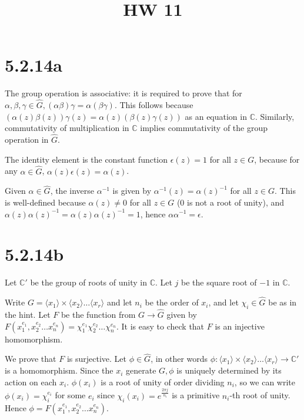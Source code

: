 \documentclass{article}
\title{HW 11}
\date{}
\def\C{\mathbb{C}}
\def\<{\langle}
\def\>{\rangle}
\def\inv{{-1}}
\begin{document}
\maketitle




\section*{5.2.14a}

The group operation is associative: it is required to prove that for $\alpha, \beta, \gamma \in \hat{G}, (\alpha\beta)\gamma = \alpha(\beta\gamma)$. This follows because $(\alpha(z)\beta(z))\gamma(z) = \alpha(z)(\beta(z)\gamma(z))$ as an equation in $\C$. Similarly, commutativity of multiplication in $\C$ implies commutativity of the group operation in $\hat{G}$.

The identity element is the constant function $\epsilon(z) = 1$ for all $z \in G$, because for any $\alpha \in \hat{G}$, $\alpha(z)\epsilon(z) = \alpha(z)$.

Given $\alpha \in \hat{G}$, the inverse $\alpha^\inv$ is given by $\alpha^\inv(z) = \alpha(z)^\inv$ for all $z \in G$. This is well-defined because $\alpha(z) \neq 0$ for all $z \in G$ (0 is not a root of unity), and $\alpha(z)\alpha(z)^\inv = \alpha(z) \alpha(z)^\inv = 1$, hence $\alpha \alpha^\inv = \epsilon$.

\section*{5.2.14b}

Let $\C'$ be the group of roots of unity in $\C$. Let $j$ be the square root of $-1$ in $\C$.

Write $G = \<x_1\> \times \<x_2\> \ldots \<x_r\>$ and let $n_i$ be the order of $x_i$, and let $\chi_i \in \hat{G}$ be as in the hint. Let $F$ be the function from $G \to \hat{G}$ given by $F(x_1^{e_1}, x_2^{e_2} \ldots x_n^{e_n}) = \chi_1^{e_1} \chi_2^{e_2} \ldots \chi_n^{e_n}$. It is easy to check that $F$ is an injective homomorphism.

We prove that $F$ is surjective. Let $\phi \in \hat{G}$, in other words $\phi : \<x_1\> \times \<x_2\> \ldots \<x_r\> \to \C'$ is a homomorphism. Since the $x_i$ generate $G, \phi$ is uniquely determined by its action on each $x_i$. $\phi(x_i)$ is a root of unity of order dividing $n_i$, so we can write $\phi(x_i) = \chi_i^{e_i}$ for some $e_i$ since $\chi_i(x_i) = e^\frac{2\pi j}{n_i}$ is a primitive $n_i$-th root of unity. Hence $\phi = F(x_1^{e_1}, x_2^{e_2} \ldots x_n^{e_n})$.
\end{document}
